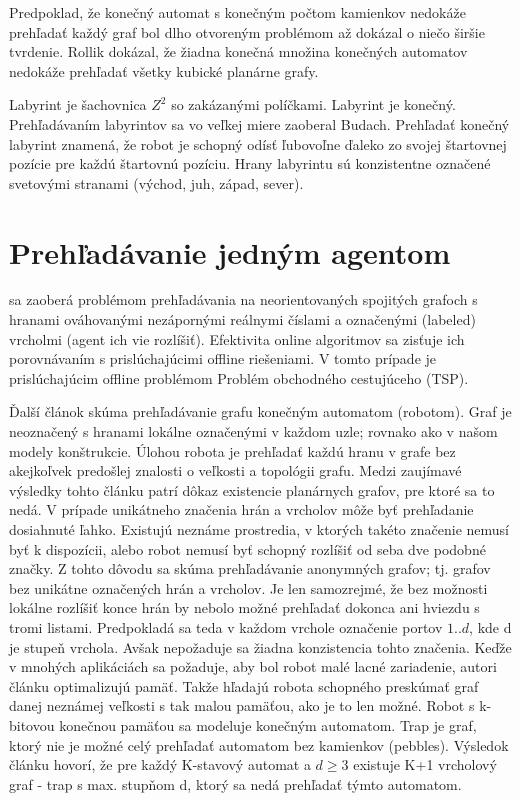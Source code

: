 Predpoklad, že konečný automat s konečným počtom 
kamienkov nedokáže prehľadať každý graf bol dlho otvoreným problémom až
\cite{ROLL} dokázal o niečo širšie tvrdenie. Rollik \cite{ROLL} dokázal, 
že žiadna konečná množina konečných automatov nedokáže prehľadať všetky 
kubické planárne grafy.

Labyrint je šachovnica $Z^2$ so zakázanými políčkami. 
Labyrint je konečný. Prehľadávaním labyrintov sa vo veľkej miere zaoberal 
Budach.
Prehľadať konečný labyrint znamená, že robot je schopný odísť ľubovoľne 
ďaleko zo svojej štartovnej pozície pre každú štartovnú pozíciu. 
Hrany labyrintu sú konzistentne označené svetovými stranami (východ, juh, 
západ, sever).

\section{Prehľadávanie jedným agentom}
\cite{OGE} sa zaoberá problémom prehľadávania na neorientovaných 
spojitých grafoch s hranami ováhovanými nezápornými reálnymi číslami a 
označenými (labeled) vrcholmi (agent ich vie rozlíšiť).
Efektivita online algoritmov sa zisťuje ich porovnávaním s  prislúchajúcimi 
offline riešeniami. V tomto prípade je prislúchajúcim offline problémom
Problém obchodného cestujúceho (TSP).

Ďalší článok \cite{GEFA}
skúma prehľadávanie grafu konečným automatom (robotom). 
Graf je neoznačený s hranami lokálne označenými v každom uzle; rovnako ako v
našom modely konštrukcie.
Úlohou robota je prehľadať každú hranu v grafe bez akejkoľvek predošlej 
znalosti o veľkosti a topológii grafu. Medzi zaujímavé výsledky tohto článku 
patrí dôkaz existencie planárnych grafov, pre ktoré sa to nedá.
V prípade unikátneho značenia hrán a vrcholov môže byť prehľadanie 
dosiahnuté ľahko. Existujú neznáme prostredia, v ktorých takéto značenie 
nemusí byť k dispozícii, alebo robot nemusí byť schopný rozlíšiť od seba dve 
podobné značky. Z tohto dôvodu sa skúma prehľadávanie anonymných grafov; 
tj. grafov bez unikátne označených hrán a vrcholov.
Je len samozrejmé, že bez možnosti lokálne rozlíšiť konce hrán by nebolo možné 
prehľadať dokonca ani hviezdu s tromi listami.
Predpokladá sa teda v každom vrchole označenie portov $1 .. d$, kde d je 
stupeň vrchola. Avšak nepožaduje sa žiadna konzistencia tohto značenia. 
Keďže v mnohých aplikáciách sa požaduje, aby bol robot malé lacné zariadenie, 
autori článku optimalizujú pamäť. Takže hľadajú robota schopného preskúmať 
graf danej neznámej veľkosti s tak malou pamäťou, ako je to len možné. 
Robot s k-bitovou konečnou pamäťou sa modeluje konečným automatom. 
Trap je graf, ktorý nie je možné 
celý prehľadať automatom bez kamienkov (pebbles). Výsledok článku hovorí, 
že pre každý K-stavový automat a $d\geq 3$ existuje K+1 vrcholový graf - trap
s max. stupňom d, ktorý sa nedá prehľadať týmto automatom.

